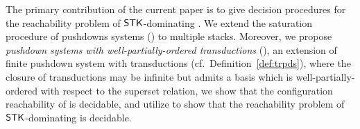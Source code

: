 The primary contribution of the current paper is to give decision procedures for the reachability problem of $\mathsf{STK}$-dominating {\AMASS}. We extend the saturation procedure of pushdowns systems (\PDS) to multiple stacks.  Moreover, we propose \emph{pushdown systems with well-partially-ordered transductions} (\WOTrPDS), an extension of finite pushdown system with transductions (cf.\ Definition~\ref{def:trpds}), where the closure of transductions may be infinite but admits a basis which is well-partially-ordered with respect to the superset relation, we show that the configuration reachability of {\WOTrPDS} is decidable, and utilize {\WOTrPDS} to show that the reachability problem of $\mathsf{STK}$-dominating {\AMASS} is decidable.


